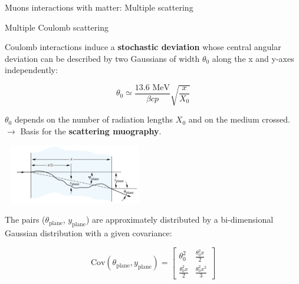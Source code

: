 \documentclass[8 pt]{beamer}
\begin{document}
\begin{frame}{Muons interactions with matter: Multiple scattering}
\justifying
\begin{exampleblock}{} Multiple Coulomb scattering \end{exampleblock}
Coulomb interactions induce a \alert{\textbf{stochastic deviation}} whose central angular deviation can be described by two Gaussians of width $\theta_0$ along the x and y-axes independently:

\begin{minipage}[c]{.48\textwidth}
\begin{equation*}
\label{eq:Moliere}
\theta_0 \simeq \frac{13.6 \text{ MeV}}{\beta c p} \sqrt{\frac{x}{X_0}}
\end{equation*}

\justifying
$\theta_0$ depends on the number of radiation lengths $X_0$ and on the medium crossed. \\
\hspace{10pt} $\rightarrow$ Basis for the \textbf{\alert{scattering muography}}.
\end{minipage} \hfill
\begin{minipage}[c]{.51\textwidth}
	\includegraphics[width=6.3cm, height=2.6cm]{figs/moliere.png}
\end{minipage} \hfill \vfill

The pairs ($\theta_\text{plane}$, $y_\text{plane}$) are approximately distributed by a bi-dimensional Gaussian distribution with a given covariance:

\begin{equation}
\text{Cov}(\theta_\text{plane}, y_\text{plane}) = \begin{bmatrix}
\theta^2_0 & \frac{\theta_0^2x}{2} \\
\frac{\theta_0^2x}{2} & \frac{\theta_0^2x^2}{3} 
\end{bmatrix}
\end{equation} \vfill
\end{frame}
\end{document}
